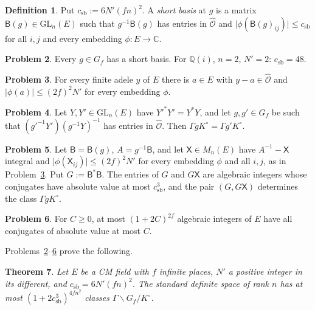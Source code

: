 \documentclass[reqno]{amsart}
\theoremstyle{definition}
\newtheorem{problem}{Problem}[section]
\newtheorem{definition}[problem]{Definition}
\theoremstyle{plain}
\newtheorem{theorem}[problem]{Theorem}
\theoremstyle{remark}
\newcommand{\Q}{\mathbb{Q}}
\newcommand{\C}{\mathbb{C}}
\newcommand{\Oh}{\hat{\mathcal{O}}}
\newcommand{\B}{\mathsf{B}}
\newcommand{\csb}{c_{\mathrm{sb}}}
\newcommand{\Ko}{K^\circ}
\begin{document}
\begin{definition}\label{def:short-basis}
Put \(\csb:=6N'(fn)^2\).  A \emph{short basis} at \(g\) is a matrix \(\B(g)\in\mathrm{GL}_n(E)\) such that \(g^{-1}\B(g)\) has entries in \(\Oh\) and \(\lvert\phi(\B(g)_{ij})\rvert\le\csb\) for all \(i,j\) and every embedding \(\phi\colon E\to\C\).
\end{definition}

\begin{problem}\label{pr:short-basis}
Every \(g\in G_f\) has a short basis.  For \(\Q(i)\), \(n=2\), \(N'=2\): \(\csb=48\).
\end{problem}

\begin{problem}\label{pr:approx}
For every finite adele \(y\) of \(E\) there is \(a\in E\) with \(y-a\in\Oh\) and \(\lvert\phi(a)\rvert\le(2f)^2N'\) for every embedding \(\phi\).
\end{problem}

\begin{problem}\label{pr:same-gram}
Let \(Y,Y'\in\mathrm{GL}_n(E)\) have \(Y'^*Y'=Y^*Y\), and let \(g,g'\in G_f\) be such that \((g'^{-1}Y')(g^{-1}Y)^{-1}\) has entries in \(\Oh\).  Then \(\Gamma g\Ko=\Gamma g'\Ko\).
\end{problem}

\begin{problem}\label{pr:invariant}
Let \(\B=\B(g)\), \(A=g^{-1}\B\), and let \(\mathsf X\in M_n(E)\) have \(A^{-1}-\mathsf X\) integral and \(\lvert\phi(\mathsf X_{ij})\rvert\le (2f)^2N'\) for every embedding \(\phi\) and all \(i,j\), as in Problem~\ref{pr:approx}.  Put \(G:=\B^*\B\).  The entries of \(G\) and \(G\mathsf X\) are algebraic integers whose conjugates have absolute value at most \(\csb^3\), and the pair \((G,G\mathsf X)\) determines the class \(\Gamma g\Ko\).
\end{problem}

\begin{problem}\label{pr:count-integers}
For \(C\ge0\), at most \((1+2C)^{2f}\) algebraic integers of \(E\) have all conjugates of absolute value at most \(C\).
\end{problem}

Problems~\ref{pr:short-basis}--\ref{pr:count-integers} prove the following.

\begin{theorem}\label{thm:class-count}
Let \(E\) be a CM field with \(f\) infinite places, \(N'\) a positive integer in its different, and \(\csb=6N'(fn)^2\).  The standard definite space of rank \(n\) has at most \((1+2\csb^3)^{4fn^2}\) classes \(\Gamma\backslash G_f/\Ko\).
\end{theorem}
\end{document}
